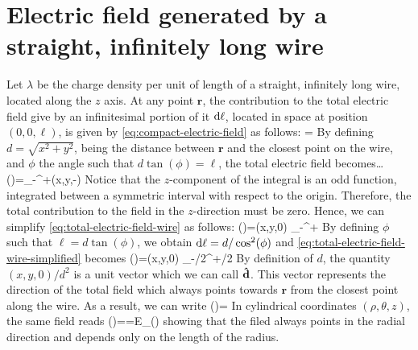 \section{Electric field generated by a straight, infinitely long wire}
Let $\lambda$ be the charge density per unit of length of a straight, infinitely long wire, located along the $z$ axis. At any point $\mathbf{r}$, the contribution to the total electric field give by an infinitesimal portion of it $\mathrm{d}\ell$, located in space at position $(0,0,\ell)$, is given by \ref{eq:compact-electric-field} as follows:
\be\label{eq:infinitesimal-electric-field-wire}
=
\ee
By defining $d=\sqrt{x^{2}+y^{2}}$, being the distance between $\mathbf{r}$ and the closest point on the wire, and $\phi$ the angle such that $d\tan(\phi)=\ell$, the total electric field becomes\dots
\be\label{eq:total-electric-field-wire}
()=\int_{-\infty}^{+\infty}(x,y,-\ell)
\ee
Notice that the $z$-component of the integral is an odd function, integrated between a symmetric interval with respect to the origin. Therefore, the total contribution to the field in the $z$-direction must be zero. Hence, we can simplify \ref{eq:total-electric-field-wire} as follows:
\be\label{eq:total-electric-field-wire-simplified}
()=(x,y,0) \int_{-\infty}^{+\infty}
\ee
By defining $\phi$ such that $\ell=d\tan(\phi)$, we obtain $\mathrm{d}\ell=d/\cos^{2}(\phi)$ and \ref{eq:total-electric-field-wire-simplified} becomes
\be\label{eq:total-electric-field-wire-using-phi}
()=(x,y,0) \int_{-\pi/2}^{+\pi/2}
\ee
By definition of $d$, the quantity $(x,y,0)/d^{2}$ is a unit vector which we can call $\boldsymbol{\hat{\textbf{$\mathrm d$}}}$. This vector represents the direction of the total field which always points towards $\mathbf{r}$ from the closest point along the wire. As a result, we can write
\be\label{eq:total-electric-field-wire-final}
()=
\ee
In cylindrical coordinates $(\rho,\theta,z)$, the same field reads
\be
{}()=\uvec{\rho}=E_{\rho}(\rho)\uvec{\rho}
\ee
showing that the filed always points in the radial direction and depends only on the length of the radius.
